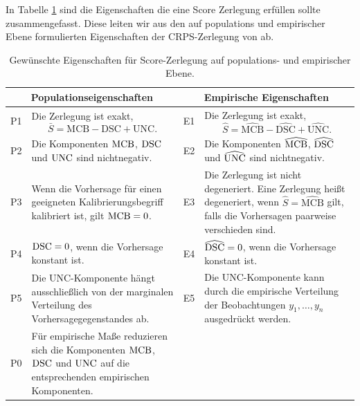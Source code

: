In Tabelle \ref{tab:vergleich_eigenschaften} sind die Eigenschaften die eine Score Zerlegung erfüllen sollte zusammengefasst. Diese leiten wir aus den auf populations und empirischer Ebene formulierten Eigenschaften der CRPS-Zerlegung von \textcite{arnold2024decompositions} ab.

\begin{table}[htbp]
\caption{Gewünschte Eigenschaften für Score-Zerlegung auf populations- und empirischer Ebene.}
\centering
\fontsize{10}{12}\selectfont

\begin{tabularx}{\textwidth}{@{}p{1.2cm}X p{1.2cm}X@{}}
\hline
\multicolumn{2}{c}{Populationseigenschaften} &
\multicolumn{2}{c}{Empirische Eigenschaften} \\
\hline

P1 & Die Zerlegung ist exakt,
\[
\bar S = \mathrm{MCB} - \mathrm{DSC} + \mathrm{UNC}.
\]
&
E1 & Die Zerlegung ist exakt,
\[
\hat S = \widehat{\mathrm{MCB}}
- \widehat{\mathrm{DSC}}
+ \widehat{\mathrm{UNC}}.
\]
\\[-0.7cm]

P2 & Die Komponenten $\mathrm{MCB}$, $\mathrm{DSC}$ und $\mathrm{UNC}$ sind nichtnegativ.
&
E2 & Die Komponenten $\widehat{\mathrm{MCB}}$,
$\widehat{\mathrm{DSC}}$ und $\widehat{\mathrm{UNC}}$ sind nichtnegativ.
\\[0.4cm]

P3 & Wenn die Vorhersage für einen geeigneten Kalibrierungsbegriff kalibriert ist, gilt $\mathrm{MCB}=0$.
&
E3 & Die Zerlegung ist nicht degeneriert. Eine Zerlegung heißt degeneriert, wenn
$\displaystyle
\hat S = \widehat{\mathrm{MCB}}
$
gilt, falls die Vorhersagen paarweise verschieden sind.
\\[0.3cm]

P4 & $\mathrm{DSC}=0$, wenn die Vorhersage konstant ist.
&
E4 & $\widehat{\mathrm{DSC}}=0$, wenn die Vorhersage konstant ist.
\\[0.3cm]

P5 & Die UNC-Komponente hängt ausschließlich von der marginalen Verteilung des Vorhersagegegenstandes ab.
&
E5 & Die UNC-Komponente kann durch die empirische Verteilung der Beobachtungen
$y_1,\dotsc,y_n$ ausgedrückt werden.
\\[0.3cm]

P0 & Für empirische Maße reduzieren sich die Komponenten $\mathrm{MCB}$, $\mathrm{DSC}$ und $\mathrm{UNC}$ auf die entsprechenden empirischen Komponenten.
&
\multicolumn{2}{l}{} \\

\hline
\end{tabularx}

\label{tab:vergleich_eigenschaften}
\end{table}






